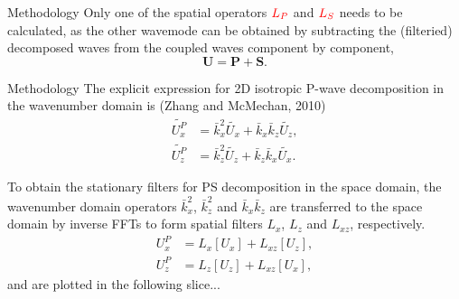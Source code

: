 \documentclass[aspectratio=43]{beamer}
\begin{document}
\begin{frame}{Methodology}
Only one of the spatial operators $\textcolor{red}{L_P}$ and $\textcolor{red}{L_S}$ needs to be calculated, as the other wavemode can be obtained by subtracting the (filteried) decomposed waves from the coupled waves component by component,
\begin{equation}
\boldsymbol{U}=\boldsymbol{P}+\boldsymbol{S}.
\end{equation}
\end{frame}
\begin{frame}{Methodology}
The explicit expression for 2D isotropic P-wave decomposition in the wavenumber domain is (Zhang and McMechan, 2010)
\begin{equation}
\begin{aligned}
\tilde{U^P_x}&=\bar{k}^2_x \tilde{U_x} + \bar{k}_x\bar{k}_z\tilde{U_z}, \\
\tilde{U^P_z}&=\bar{k}^2_z \tilde{U_z} + \bar{k}_z\bar{k}_x\tilde{U_x}.
\end{aligned}
\end{equation}

To obtain the stationary filters for PS decomposition in the space domain, the wavenumber domain operators $\bar{k}^2_x$, $\bar{k}^2_z$ and $\bar{k}_x\bar{k}_z$ are transferred to the space domain by inverse FFTs to form spatial filters $L_x$, $L_z$ and $L_{xz}$, respectively.
\begin{equation}
\begin{aligned}
U^P_x&=L_x[U_x] + L_{xz}[U_z], \\
U^P_z&=L_z[U_z] + L_{xz}[U_x],
\end{aligned}
\end{equation}
and are plotted in the following slice...
\end{frame}
 
\end{document}
